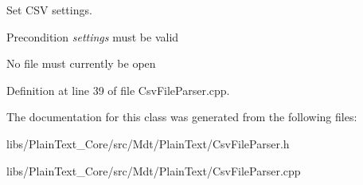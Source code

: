 Set C\+SV settings. 

\begin{DoxyPrecond}{Precondition}
{\itshape settings} must be valid 

No file must currently be open 
\end{DoxyPrecond}


Definition at line 39 of file Csv\+File\+Parser.\+cpp.



The documentation for this class was generated from the following files\+:\begin{DoxyCompactItemize}
\item 
libs/\+Plain\+Text\+\_\+\+Core/src/\+Mdt/\+Plain\+Text/Csv\+File\+Parser.\+h\item 
libs/\+Plain\+Text\+\_\+\+Core/src/\+Mdt/\+Plain\+Text/Csv\+File\+Parser.\+cpp\end{DoxyCompactItemize}

